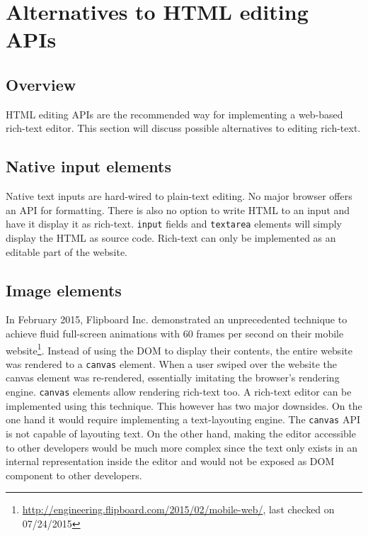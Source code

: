\section{Alternatives to HTML editing APIs}
\label{sec:alt_to_edit_apis}

\subsection{Overview}

HTML editing APIs are the recommended way for implementing a web-based rich-text editor. This section will discuss possible alternatives to editing rich-text.

\subsection{Native input elements} Native text inputs are hard-wired to plain-text editing. No major browser offers an API for formatting. There is also no option to write HTML to an input and have it display it as rich-text. \texttt{input} fields and \texttt{textarea} elements will simply display the HTML as source code. Rich-text can only be implemented as an editable part of the website.

\subsection{Image elements} In February 2015, Flipboard Inc. demonstrated an unprecedented technique to achieve fluid full-screen animations with 60 frames per second on their mobile website\footnote{\url{http://engineering.flipboard.com/2015/02/mobile-web/}, last checked on 07/24/2015}. Instead of using the DOM to display their contents, the entire website was rendered to a \texttt{canvas} element. When a user swiped over the website the canvas element was re-rendered, essentially imitating the browser's rendering engine. \texttt{canvas} elements allow rendering rich-text too. A rich-text editor can be implemented using this technique. This however has two major downsides. On the one hand it would require implementing a text-layouting engine. The \texttt{canvas} API is not capable of layouting text. On the other hand, making the editor accessible to other developers would be much more complex since the text only exists in an internal representation inside the editor and would not be exposed as DOM component to other developers.

